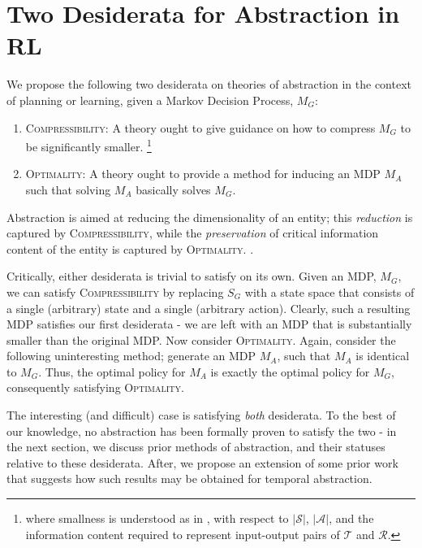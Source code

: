 \section{Two Desiderata for Abstraction in RL}

We propose the following two desiderata on theories of abstraction in the context of planning or learning, given a Markov Decision Process, $M_G$:
\begin{enumerate}
\item \textsc{Compressibility}: A theory ought to give guidance on how to compress $M_G$ to be significantly smaller. \footnote{where smallness is understood as in \cite{littman1995complexity}, with respect to $|\mathcal{S}|$, $|\mathcal{A}|$, and the information content required to represent input-output pairs of $\mathcal{T}$ and $\mathcal{R}$.}
\item \textsc{Optimality}: A theory ought to provide a method for inducing an MDP $M_A$ such that solving $M_A$ basically solves $M_G$.
\end{enumerate}

Abstraction is aimed at reducing the dimensionality of an entity; this {\it reduction} is captured by \textsc{Compressibility}, while the {\it preservation} of critical information content of the entity is captured by \textsc{Optimality}. .

Critically, either desiderata is trivial to satisfy on its own. Given an \ac{MDP}, $M_G$, we can satisfy \textsc{Compressibility} by replacing $S_G$ with a state space that consists of a single (arbitrary) state and a single (arbitrary action). Clearly, such a resulting \ac{MDP} satisfies our first desiderata - we are left with an MDP that is substantially smaller than the original MDP. Now consider \textsc{Optimality}. Again, consider the following uninteresting method; generate an MDP $M_A$, such that $M_A$ is identical to $M_G$. Thus, the optimal policy for $M_A$ is exactly the optimal policy for $M_G$, consequently satisfying \textsc{Optimality}.

The interesting (and difficult) case is satisfying {\it both} desiderata. To the best of our knowledge, no abstraction has been formally proven to satisfy the two - in the next section, we discuss prior methods of abstraction, and their statuses relative to these desiderata. After, we propose an extension of some prior work that suggests how such results may be obtained for temporal abstraction.
